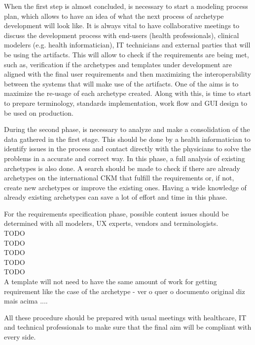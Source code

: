 \documentclass[mim_thesis.tex]{subfiles}
\begin{document}
When the first step is almost concluded, is necessary to start a modeling process plan, which allows to have an idea of what the next process of archetype development will look like. It is always vital to have collaborative meetings to discuss the development process with end-users (health professionals), clinical modelers (e.g. health informatician), IT technicians and external parties that will be using the artifacts. This will allow to check if the requirements are being met, such as, verification if the archetypes and templates under development are aligned with the final user requirements and then maximizing the interoperability between the systems that will make use of the artifacts. One of the aims is to maximize the re-usage of each archetype created. Along with this, is time to start to prepare terminology, standards implementation, work flow and \ac{GUI} design to be used on production. 

During the second phase, is necessary to analyze and make a consolidation of the data gathered in the first stage. This should be done by a health informatician to identify issues in the process and contact directly with the physicians to solve the problems in a accurate and correct way. In this phase, a full analysis of existing archetypes is also done. A search should be made to check if there are already archetypes on the international CKM that fulfill the requirements or, if not, create new archetypes or improve the existing ones. Having a wide knowledge of already existing archetypes can save a lot of effort and time in this phase. 

For the requirements specification phase, possible content issues should be determined with all modelers, \ac{UX} experts, vendors and terminologists.\\
TODO\\
TODO\\
TODO\\
TODO\\
TODO\\

A template will not need to have the same amount of work for getting requirement like the case of the archetype - ver o quer o documento original diz mais acima ....

All these procedure should be prepared with usual meetings with healthcare, IT and technical professionals to make sure that the final aim will be compliant with every side.
\end{document}
